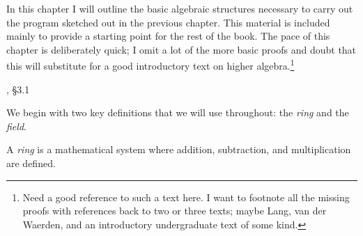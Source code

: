 

\begin{comment}
The author of a mathematics text, really any text in a technical
subject, is faced with a difficult choice --- how much to leave out?
How often to refer readers to references?  How much knowledge
to presuppose?

Now, in the early twenty-first century, we are faced with
technological changes that affect the author's approach.  First, we
have the ability to distribute very large books, file size being a
slight or absent impediment.  Also, we have a political and economic
structure that relies heavily on using copyright to restrict and
control information flow.  These factor have influenced me to decide
in favor of writing a larger and more comprehensive text, that aims to
introduce abstract algebra as much it tries to teach integration
theory.
\end{comment}

In this chapter I will outline the basic algebraic structures
necessary to carry out the program sketched out in the previous
chapter.  This material is included mainly to provide a starting point
for the rest of the book. The pace of this chapter is
deliberately quick; I omit a lot of the more basic proofs and doubt
that this will substitute for a good introductory text on higher
algebra.\footnote{Need a good reference to such a text here.
I want to footnote all the missing proofs with references
back to two or three texts; maybe Lang, van der Waerden,
and an introductory undergraduate text of some kind.}

, \S3.1

We begin with two key definitions that we will use throughout: the
{\it ring} and the {\it field}.

\begin{comment}
Both rings and fields are defined over sets with two binary operators,
conventionally called addition and multiplication.  It will appease
the nervous reader to know that for our purposes,
addition is addition and multiplication is multiplication --- the same
addition and multiplication we learned in grade school.  Of
course, in the general case, any pair of operations that obey the
axioms will suffice to form a ring or a field, but we won't need to
concern ourselves with this.
\end{comment}

\begin{key point}
A {\it ring} is a mathematical system where addition,
subtraction, and multiplication are defined.
\end{key point}

